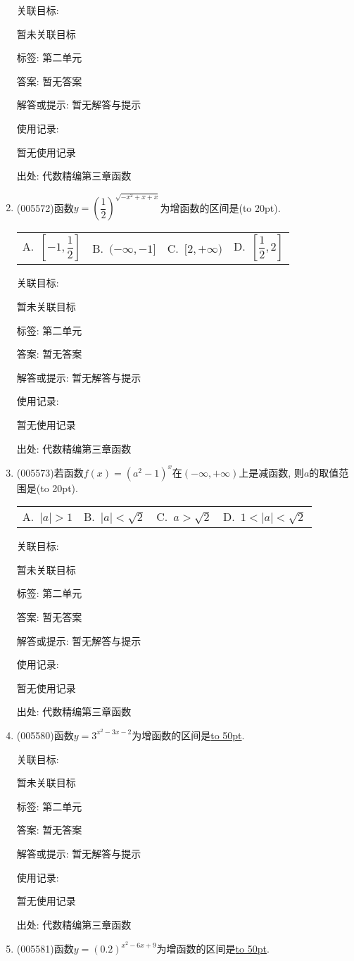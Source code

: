 \documentclass[10pt,a4paper]{article}
\newcommand{\blank}[1]{\underline{\hbox to #1pt{}}}
\newcommand{\bracket}[1]{(\hbox to #1pt{})}
\newcommand{\fourch}[4]{\par\begin{tabular}{p{.23\textwidth}p{.23\textwidth}p{.23\textwidth}p{.23\textwidth}}
A.~#1 &B.~#2& C.~#3& D.~#4
\end{tabular}}
\begin{document}
\begin{enumerate}[1.]
关联目标:

暂未关联目标



标签: 第二单元

答案: 暂无答案

解答或提示: 暂无解答与提示

使用记录:

暂无使用记录


出处: 代数精编第三章函数
\item { (005572)}函数$y=(\dfrac 12)^{\sqrt {-x^2+x+x}}$为增函数的区间是\bracket{20}.
\fourch{$[-1,\dfrac 12]$}{$(-\infty ,-1]$}{$[2,+\infty)$}{$[\dfrac 12,2]$}


关联目标:

暂未关联目标



标签: 第二单元

答案: 暂无答案

解答或提示: 暂无解答与提示

使用记录:

暂无使用记录


出处: 代数精编第三章函数
\item { (005573)}若函数$f(x)=(a^2-1)^x$在$(-\infty ,+\infty)$上是减函数, 则$a$的取值范围是\bracket{20}.
\fourch{$|a|>1$}{$|a|<\sqrt 2$}{$a>\sqrt 2$}{$1<|a|<\sqrt 2$}


关联目标:

暂未关联目标



标签: 第二单元

答案: 暂无答案

解答或提示: 暂无解答与提示

使用记录:

暂无使用记录


出处: 代数精编第三章函数
\item { (005580)}函数$y=3^{x^2-3x-2}$为增函数的区间是\blank{50}.


关联目标:

暂未关联目标



标签: 第二单元

答案: 暂无答案

解答或提示: 暂无解答与提示

使用记录:

暂无使用记录


出处: 代数精编第三章函数
\item { (005581)}函数$y=(0.2)^{x^2-6x+9}$为增函数的区间是\blank{50}.



\end{enumerate}
\end{document}

